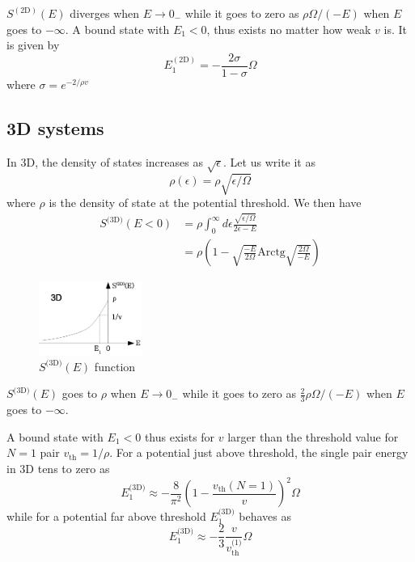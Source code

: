 \documentclass{article}
\newcommand{\sd}{{\ensuremath{{\text{(3D)}}}}}
\newcommand{\Arctg}{\ensuremath{\text{Arctg}}}
\begin{document}
$S^{(\text{2D})}(E)$ diverges when $E\rightarrow{}0_{-}$ while it goes to zero as $\rho\Omega/(-E)$ when $E$ goes to $-\infty$. A bound state with $E_1<0$, thus exists no matter how weak $v$ is. It is given by 
\begin{equation}
E_1^{(\text{2D})}=-\frac{2\sigma}{1-\sigma}\Omega
\label{eq:}
\end{equation}
where $\sigma=e^{-2/\rho{v}}$



\subsection{3D systems}
In 3D, the density of states increases as $\sqrt{\epsilon}$. Let us write it as 
\begin{equation}
\rho(\epsilon)=\rho\sqrt{\epsilon/\Omega}
\label{eq:}
\end{equation}
where $\rho$ is the density of state at the potential threshold. We then have
\begin{equation}
\begin{split}
S^\sd(E<0)&=\rho\int_0^\infty{}d\epsilon\frac{\sqrt{\epsilon/\Omega}}{2\epsilon-E}\\
	&=\rho(1-\sqrt{\frac{-E}{2\Omega}}\Arctg\sqrt{\frac{2\Omega}{-E}})
\label{eq:}
\end{split}
\end{equation}
\begin{figure}[htbp]
	\centering
		\includegraphics[width=0.30\textwidth]{3dOnePair.eps}
	\caption{$S^\sd(E)$ function}
	\label{fig:3dOnePair}
\end{figure}

$S^\sd(E)$ goes to $\rho$ when $E\rightarrow0_-$ while it goes to zero as $\frac{2}{3}\rho\Omega/(-E)$ when $E$ goes to $-\infty$. 

A bound state with $E_1<0$ thus exists for $v$ larger than the threshold value for $N=1$ pair $v_{\text{th}}=1/\rho$.  For a potential just above threshold, the single pair energy in 3D tens to zero as 
\begin{equation}
E_1^\sd\approx-\frac{8}{\pi^2}\left(1-\frac{v_{\text{th}}(N=1)}{v}\right)^2\Omega
\label{eq:}
\end{equation}
while for a potential far above threshold $E_1^\sd$ behaves as 
\begin{equation}
E_1^\sd\approx-\frac{2}{3}\frac{v}{v_\text{th}^{\text{(1)}}}\Omega
\label{eq:}
\end{equation}
\end{document}
